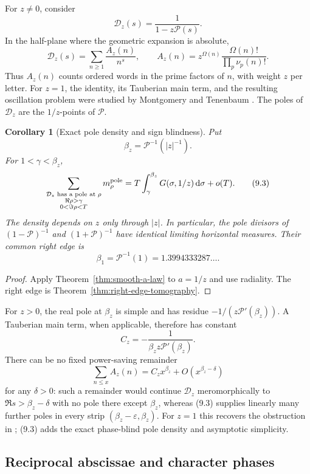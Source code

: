 \documentclass[11pt]{article}
\newtheorem{corollary}[theorem]{Corollary}
\theoremstyle{definition}
\theoremstyle{remark}
\newcommand{\cP}{\mathcal P}
\newcommand{\dd}{\,\mathrm d}
\newcommand{\eps}{\varepsilon}
\begin{document}
For $z\ne0$, consider
\[
 \mathcal D_z(s)=\frac1{1-z\cP(s)}.
\tag{9.1}
\]
In the half-plane where the geometric expansion is absolute,
\[
 \mathcal D_z(s)=\sum_{n\ge1}\frac{A_z(n)}{n^s},
 \qquad
 A_z(n)=z^{\Omega(n)}
 \frac{\Omega(n)!}{\prod_p\nu_p(n)!}.
\tag{9.2}
\]
Thus $A_z(n)$ counts ordered words in the prime factors of $n$, with weight $z$ per
letter.  For $z=1$, the identity, its Tauberian main term, and the resulting
oscillation problem were studied by Montgomery and Tenenbaum
\cite{MontgomeryTenenbaum2017}.  The poles of $\mathcal D_z$ are the $1/z$-points
of $\cP$.

\begin{corollary}[Exact pole density and sign blindness]
\label{cor:froberg-density}
Put
\[
 \beta_z=\cP^{-1}(|z|^{-1}).
\]
For $1<\gamma<\beta_z$,
\[
 \sum_{\substack{\mathcal D_z\text{ has a pole at }\rho\\
                  \Re\rho>\gamma\\0<\Im\rho<T}}
 m_\rho^{\rm pole}
 =T\int_\gamma^{\beta_z}G(\sigma,1/z)\dd\sigma+o(T).
\tag{9.3}
\]
The density depends on $z$ only through $|z|$.  In particular, the pole divisors of
$(1-\cP)^{-1}$ and $(1+\cP)^{-1}$ have identical limiting horizontal measures.
Their common right edge is
\[
 \beta_1=\cP^{-1}(1)=1.3994333287\ldots .
\tag{9.4}
\]
\end{corollary}

\begin{proof}
Apply Theorem~\ref{thm:smooth-a-law} to $a=1/z$ and use radiality.  The right edge is
Theorem~\ref{thm:right-edge-tomography}.
\end{proof}

For $z>0$, the real pole at $\beta_z$ is simple and has residue
$-1/(z\cP'(\beta_z))$.  A Tauberian main term, when applicable, therefore has constant
\[
 C_z=-\frac1{\beta_zz\cP'(\beta_z)}.
\tag{9.5}
\]
There can be no fixed power-saving remainder
\[
 \sum_{n\le x}A_z(n)=C_zx^{\beta_z}+O(x^{\beta_z-\delta})
\tag{9.6}
\]
for any $\delta>0$: such a remainder would continue $\mathcal D_z$ meromorphically
to $\Re s>\beta_z-\delta$ with no pole there except $\beta_z$, whereas (9.3) supplies
linearly many further poles in every strip $(\beta_z-\eps,\beta_z)$.  For $z=1$ this
recovers the obstruction in \cite{MontgomeryTenenbaum2017}; (9.3) adds the exact
phase-blind pole density and asymptotic simplicity.

\subsection{Reciprocal abscissae and character phases}
\end{document}
